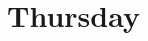 \documentclass[,%
	draft=false,%
	numbers=noendperiod
	12pt,
	a4paper,
	oneside,%
	openany,
]{memoir}
\begin{document}
\begin{comment}
		Supp s.c.\ $\Psi$-term $t\occ{v}$ s.t. $v\sigma_i$ contains grey $u$\todo{basically also grey occ of $v$ with $t\occ{u}$ conceivable, but that should be IH}.
		By IH, $v$ does not occur grey in a a $\Phi$-literal (given it does not occur grey in a grey literal). 

		By IH, there is no s.c.{} $\Psi$-term which contains $u$.
		Hence $t\occ{v}$ is not directly unified with some $t\occ{u}$.

		Supp $v$ occs grey where it is unified. then $u$ occs grey there as well.
		Then it can't be a grey literal, and it can't be a $\Phi$-literal. So it is a $\Psi$-literal.

	\end{proof}

	~

	\begin{clemma}
		If a var occurs in $\Gamma$ but not grey in a grey literal, it does not occur grey in $\Delta$.
	\end{clemma}

\end{comment}


\section{Thursday}
\end{document}

